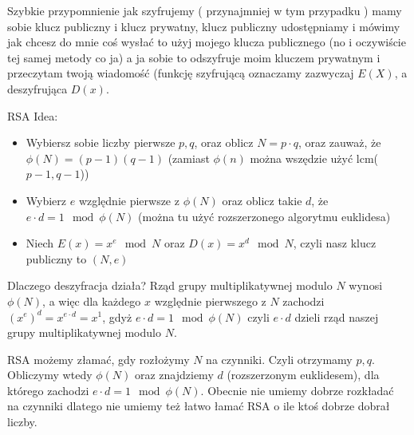 Szybkie przypomnienie jak szyfrujemy ( przynajmniej w tym przypadku ) mamy sobie klucz publiczny i klucz prywatny, klucz publiczny udostępniamy i mówimy jak chcesz do mnie coś wysłać to użyj mojego klucza publicznego (no i oczywiście tej samej metody co ja) a ja sobie to odszyfruje moim kluczem prywatnym i przeczytam twoją wiadomość (funkcję szyfrującą oznaczamy zazwyczaj $E(X)$, a deszyfrująca $D(x)$. \newline \newline

RSA Idea:
\begin{itemize}
    \item Wybiersz sobie liczby pierwsze $p,q$, oraz oblicz $N = p\cdot q$, oraz zauważ, że $\phi(N) = (p-1)(q-1)$ (zamiast $\phi(n)$ można wszędzie użyć lcm($p-1,q-1$))
    \item Wybierz $e$ względnie pierwsze z $\phi(N)$ oraz oblicz takie $d$, że $e\cdot d = 1 \mod \phi(N)$ (można tu użyć rozszerzonego algorytmu euklidesa)
    \item Niech $E(x) = x^e \mod N$ oraz $D(x) = x^d \mod N$, czyli nasz klucz publiczny to $(N,e)$
\end{itemize}

Dlaczego deszyfracja działa? \newline
Rząd grupy multiplikatywnej modulo $N$ wynosi $\phi(N)$, a więc dla każdego $x$ względnie pierwszego z $N$ zachodzi $(x^{e})^d = x^{e\cdot d} = x^1$, gdyż $e\cdot d = 1 \mod \phi(N)$ czyli $e\cdot d$ dzieli rząd naszej grupy multiplikatywnej modulo $N$.
\newline \newline

RSA możemy złamać, gdy rozłożymy $N$ na czynniki. Czyli otrzymamy $p,q$. Obliczymy wtedy $\phi(N)$ oraz znajdziemy $d$ (rozszerzonym euklidesem), dla którego zachodzi $e\cdot d = 1 \mod \phi(N)$. Obecnie nie umiemy dobrze rozkładać na czynniki dlatego nie umiemy też łatwo łamać RSA o ile ktoś dobrze dobrał liczby.
\newline \newline


